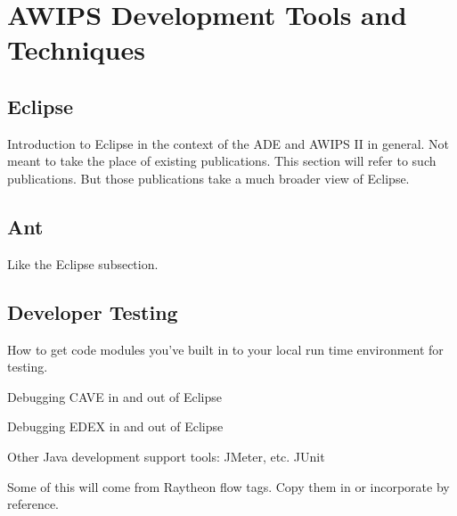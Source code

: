 
\chapter{AWIPS Development Tools and Techniques}



\section{Eclipse}

Introduction to Eclipse in the context of the ADE and AWIPS II in 
general.  Not meant to take the place of existing publications.  
This section will refer to such publications.  But those
publications take a much broader view of Eclipse.

\section{Ant}

Like the Eclipse subsection.


\section{Developer Testing}

How to get code modules you've built in to your local run time 
environment for testing.

Debugging CAVE in and out of Eclipse

Debugging EDEX in and out of Eclipse

Other Java development support tools: JMeter, etc.
JUnit

Some of this will come from Raytheon flow tags.  Copy them in or 
incorporate by reference.



